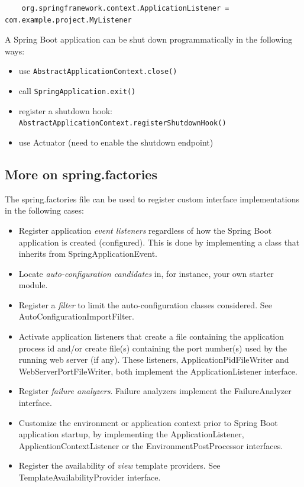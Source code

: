 \documentclass{scrartcl}
\begin{document}
\begin{lstlisting}
    org.springframework.context.ApplicationListener = com.example.project.MyListener
\end{lstlisting}

A Spring Boot application can be shut down programmatically in the following ways:
\begin{itemize}
    \item use \lstinline|AbstractApplicationContext.close()|
    \item call \lstinline|SpringApplication.exit()|
    \item register a shutdown hook: \lstinline|AbstractApplicationContext.registerShutdownHook()|
    \item use Actuator (need to enable the shutdown endpoint)
\end{itemize}

\subsection{More on spring.factories}

The spring.factories file can be used to register custom interface implementations in the following cases:

\begin{itemize}
    \item Register application \textit{event listeners} regardless of how the Spring Boot application is created (configured). This is done by implementing a class that inherits from SpringApplicationEvent.
    \item Locate \textit{auto-configuration candidates} in, for instance, your own starter module.
    \item Register a \textit{filter} to limit the auto-configuration classes considered. See AutoConfigurationImportFilter.
    \item  Activate application listeners that create a file containing the application process id and/or create file(s) containing the port number(s) used by the running web server (if any). These listeners, ApplicationPidFileWriter and WebServerPortFileWriter, both implement the ApplicationListener interface.
    \item Register \textit{failure analyzers}. Failure analyzers implement the FailureAnalyzer interface.
    \item Customize the environment or application context prior to Spring Boot application startup, by implementing the ApplicationListener, ApplicationContextListener or the EnvironmentPostProcessor interfaces.
    \item Register the availability of \textit{view} template providers. See TemplateAvailabilityProvider interface.
\end{itemize}
\end{document}
